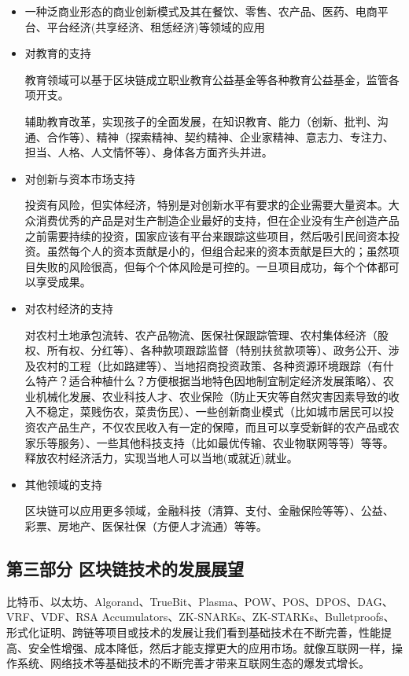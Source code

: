 \documentclass[UTF9]{ctexart}
\begin{document}
\begin{itemize}

\item 一种泛商业形态的商业创新模式及其在餐饮、零售、农产品、医药、电商平台、平台经济(共享经济、租恁经济)等领域的应用

\item 对教育的支持

教育领域可以基于区块链成立职业教育公益基金等各种教育公益基金，监管各项开支。

辅助教育改革，实现孩子的全面发展，在知识教育、能力（创新、批判、沟通、合作等）、精神（探索精神、契约精神、企业家精神、意志力、专注力、担当、人格、人文情怀等）、身体各方面齐头并进。

\item 对创新与资本市场支持

投资有风险，但实体经济，特别是对创新水平有要求的企业需要大量资本。大众消费优秀的产品是对生产制造企业最好的支持，但在企业没有生产创造产品之前需要持续的投资，国家应该有平台来跟踪这些项目，然后吸引民间资本投资。虽然每个人的资本贡献是小的，但组合起来的资本贡献是巨大的；虽然项目失败的风险很高，但每个个体风险是可控的。一旦项目成功，每个个体都可以享受成果。

\item 对农村经济的支持

对农村土地承包流转、农产品物流、医保社保跟踪管理、农村集体经济（股权、所有权、分红等）、各种款项跟踪监督（特别扶贫款项等）、政务公开、涉及农村的工程（比如路建等）、当地招商投资政策、各种资源环境跟踪（有什么特产？适合种植什么？方便根据当地特色因地制宜制定经济发展策略）、农业机械化发展、农业科技人才、农业保险（防止天灾等自然灾害因素导致的收入不稳定，菜贱伤农，菜贵伤民）、一些创新商业模式（比如城市居民可以投资农产品生产，不仅农民收入有一定的保障，而且可以享受新鲜的农产品或农家乐等服务）、一些其他科技支持（比如最优传输、农业物联网等等）等等。释放农村经济活力，实现当地人可以当地(或就近)就业。

\item 其他领域的支持

区块链可以应用更多领域，金融科技（清算、支付、金融保险等等）、公益、彩票、房地产、医保社保（方便人才流通）等等。

\end{itemize}

\subsection{第三部分 区块链技术的发展展望}

比特币、以太坊、Algorand、TrueBit、Plasma、POW、POS、DPOS、DAG、VRF、VDF、RSA Accumulators、ZK-SNARKs、ZK-STARKs、Bulletproofs、形式化证明、跨链等项目或技术的发展让我们看到基础技术在不断完善，性能提高、安全性增强、成本降低，然后才能支撑更大的应用市场。就像互联网一样，操作系统、网络技术等基础技术的不断完善才带来互联网生态的爆发式增长。
\end{document}
